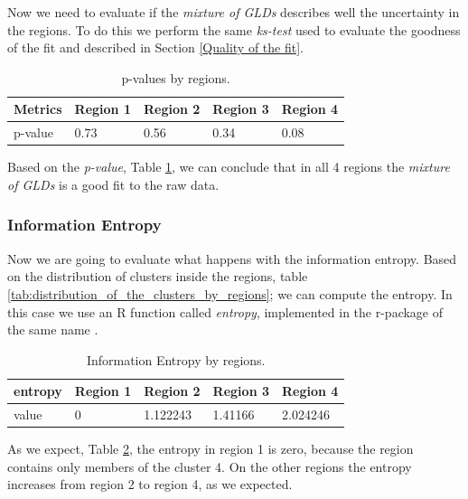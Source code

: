 Now we need to evaluate if the \textit{mixture of GLDs} describes well the uncertainty in the regions. To do this we perform the same \textit{ks-test} used to evaluate the goodness of the fit and described in Section \ref{Quality of the fit}. 

\begin{table}
\begin{center}
    \begin{tabular}{|l|l|l|l|l|}
    \hline
    \textbf{Metrics} & \textbf{Region 1} &  \textbf{Region 2} &  \textbf{Region 3} &   \textbf{Region 4}  \\ \hline
    p-value     & 0.73   		& 0.56 & 0.34 & 0.08            \\ \hline
    \end{tabular}
    \caption {p-values by regions.}
    \label{tab:p_values_by_regions}
    \end{center}
\end{table}

Based on the \textit{p-value}, Table \ref{tab:p_values_by_regions}, we can conclude that in all 4 regions the \textit{mixture of GLDs} is a good fit to the raw data.

\subsubsection{Information Entropy}\label{informationEntropyresults}
Now we are going to evaluate what happens with the information entropy. Based on the distribution of clusters inside the regions, table \ref{tab:distribution_of_the_clusters_by_regions}; we can compute the entropy. In this case we use an R function called \textit{entropy}, implemented in the r-package of the same name  \cite{Hausser2008}.

\begin{table}
\begin{center}
    \begin{tabular}{|l|l|l|l|l|}
    \hline
    \textbf{entropy} & \textbf{Region 1} &  \textbf{Region 2} &  \textbf{Region 3} &   \textbf{Region 4}  \\ \hline
    value     & 0   		& 1.122243 & 1.41166 & 2.024246            \\ \hline
    \end{tabular}
    \caption {Information Entropy by regions.}
    \label{tab:entropy_by_regions}
    \end{center}
\end{table}

As we expect, Table \ref{tab:entropy_by_regions}, the entropy in region 1 is zero, because the region contains only members of the cluster 4. On the other regions the entropy increases from region 2 to region 4, as we expected.

